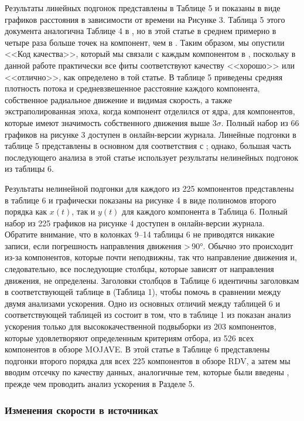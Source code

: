 Результаты линейных подгонок представлены в Таблице 5 и показаны в виде графиков расстояния в
зависимости от времени на Рисунке 3. Таблица 5 этого документа аналогична Таблице 4 в
\cite{Piner_2007}, но в этой статье в среднем примерно в четыре раза больше точек на
компонент, чем в \cite{Piner_2007}. Таким образом, мы опустили <<Код качества>>,
который мы связали с каждым компонентом в \cite{Piner_2007}, поскольку в данной работе практически
все фиты соответствуют качеству <<хорошо>> или <<отлично>>, как определено в той статье. В таблице
5 приведены средняя плотность потока и средневзвешенное расстояние каждого компонента, собственное
радиальное движение и видимая скорость, а также экстраполированная эпоха, когда компонент отделился
от ядра, для компонентов, которые имеют значимость собственного движения выше $3\sigma$. Полный
набор из 66 графиков на рисунке 3 доступен в онлайн-версии журнала. Линейные подгонки в таблице
5 представлены в основном для соответствия с \cite{Piner_2007}; однако, большая часть
последующего анализа в этой статье использует результаты нелинейных подгонок из таблицы 6.

Результаты нелинейной подгонки для каждого из 225 компонентов представлены в таблице 6 и графически
показаны на рисунке 4 в виде полиномов второго порядка как $x(t)$, так и $y(t)$ для
каждого компонента в Таблица 6. Полный набор из 225 графиков на рисунке 4 доступен в
онлайн-версии журнала. Обратите внимание, что в колонках 9--14 таблицы 6 не приводятся никакие
записи, если погрешность направления движения >\,\ang{90}. Обычно это происходит
из-за компонентов, которые почти неподвижны, так что направление движения и, следовательно, все
последующие столбцы, которые зависят от направления движения, не определены. Заголовки столбцов в
Таблице 6 идентичны заголовкам в соответствующей таблице в \cite{Homan_2009} (Таблица 1), чтобы
помочь в сравнении между двумя анализами ускорения. Одно из основных отличий между таблицей 6 и
соответствующей таблицей из \cite{Homan_2009} состоит в том, что в таблице 1 из \cite{Homan_2009}
показан анализ ускорения только для высококачественной подвыборки из 203 компонентов, которые
удовлетворяют определенным критериям отбора, из 526 всех компонентов в обзоре MOJAVE. В этой статье
в Таблице 6 представлены подгонки второго порядка для всех 225 компонентов в обзоре RDV, а затем
мы вводим отсечку по качеству данных, аналогичные тем, которые были введены \cite{Homan_2009},
прежде чем проводить анализ ускорения в Разделе 5.

\subsubsection{Изменения скорости в источниках}

